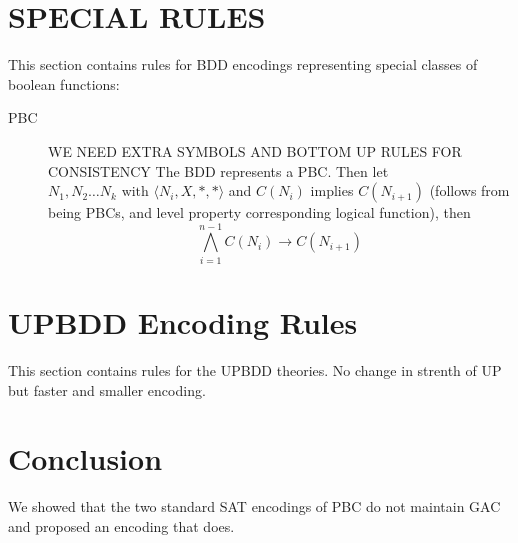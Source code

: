 \documentclass[10pt,twocolumn]{article}
\newcommand{\TODO}[1]{\textcolor[rgb]{1.00,0.00,0.00}{#1} }
\begin{document}
\section{SPECIAL RULES}
This section contains rules for BDD encodings representing special classes of 
boolean functions:  

\begin{description}
\item[PBC] \TODO{WE NEED EXTRA SYMBOLS AND BOTTOM UP RULES FOR CONSISTENCY} The BDD 
represents a PBC. Then let $N_1,N_2 \ldots N_k \text{ with } \langle 
N_i,X,\ast,\ast\rangle$ and $C(N_i)$ implies $C(N_{i+1})$ (follows from being 
PBCs, and level property corresponding logical function), then 
    \[
    \bigwedge_{i=1}^{n-1} C(N_i) \rightarrow C(N_{i+1})
    \]
\end{description}

\section{UPBDD Encoding Rules}

This section contains rules for the UPBDD theories. No change in strenth of UP 
but faster and smaller encoding.  


\section{Conclusion}

We showed that the two standard SAT encodings of PBC do not maintain GAC and proposed an encoding that does.
\end{document}
